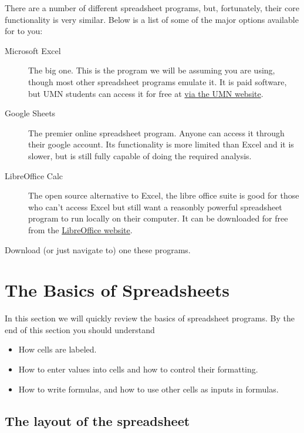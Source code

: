 \documentclass[10pt]{article}
\begin{document}
There are a number of different spreadsheet programs, but, fortunately, their core functionality is very similar. 
Below is a list of some of the major options available for to you:

\begin{description}
    \item[Microsoft Excel] The big one. This is the program we will be assuming you are using, though most other spreadsheet programs emulate it. 
        It is paid software, but UMN students can access it for free at \href{https://it.umn.edu/services-technologies/how-tos/microsoft-office-365-pro-plus-faculty}{via the UMN website}.
    \item[Google Sheets] The premier online spreadsheet program. Anyone can access it through their google account. Its functionality is more limited than Excel and it is slower, but is still fully capable of doing the required analysis.
    \item[LibreOffice Calc] The open source alternative to Excel, the libre office suite is good for those who can't access Excel but still want a reasonbly powerful spreadsheet program to run locally on their computer. It can be downloaded for free from the \href{https://www.libreoffice.org/discover/calc/}{LibreOffice website}.
\end{description}


\begin{exercise}
	Download (or just navigate to) one these programs. 
\end{exercise}



\newpage

\section{The Basics of Spreadsheets}%
\label{sec:the_basics_of_spreadsheets}

In this section we will quickly review the basics of spreadsheet programs. By the end of this section you should understand 
\begin{itemize}
	\item How cells are labeled.
	\item How to enter values into cells and how to control their formatting.
	\item How to write formulas, and how to use other cells as inputs in formulas.
\end{itemize}


\subsection{The layout of the spreadsheet}%
\label{sub:the_layout_of_the_spreadsheet}
\end{document}

